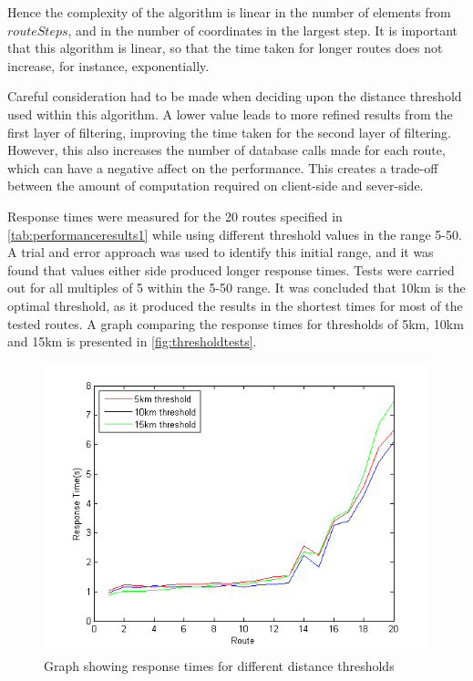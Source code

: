 \documentclass[authoryearcitations]{UoYCSproject}
\begin{document}
Hence the complexity of the algorithm is linear in the number of elements from $routeSteps$, and in the number of coordinates in the largest step. It is important that this algorithm is linear, so that the time taken for longer routes does not increase, for instance, exponentially.

Careful consideration had to be made when deciding upon the distance threshold used within this algorithm. A lower value leads to more refined results from the first layer of filtering, improving the time taken for the second layer of filtering. However, this also increases the number of database calls made for each route, which can have a negative affect on the performance. This creates a trade-off between the amount of computation required on client-side and sever-side. 

Response times were measured for the 20 routes specified in \autoref{tab:performanceresults1} while using different threshold values in the range 5-50. A trial and error approach was used to identify this initial range, and it was found that values either side produced longer response times. Tests were carried out for all multiples of 5 within the 5-50 range. It was concluded that 10km is the optimal threshold, as it produced the results in the shortest times for most of the tested routes. A graph comparing the response times for thresholds of 5km, 10km and 15km is presented in \autoref{fig:thresholdtests}.

\begin{figure}
	\center
	\includegraphics[scale=1]{thresholdtests}
	\caption{Graph showing response times for different distance thresholds}
	\label{fig:thresholdtests}
\end{figure}
\end{document}

